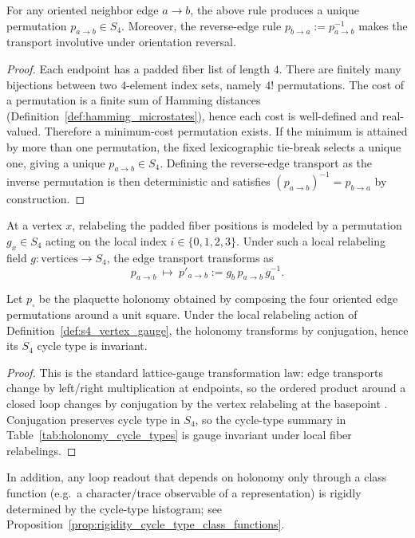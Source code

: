 \begin{lemma}\label{lem:edge_transport_welldefined}
For any oriented neighbor edge $a\to b$, the above rule produces a unique permutation $p_{a\to b}\in S_4$.
Moreover, the reverse-edge rule $p_{b\to a}:=p_{a\to b}^{-1}$ makes the transport involutive under orientation reversal.
\end{lemma}
\begin{proof}
Each endpoint has a padded fiber list of length $4$.
There are finitely many bijections between two $4$-element index sets, namely $4!$ permutations.
The cost of a permutation is a finite sum of Hamming distances (Definition~\ref{def:hamming_microstates}), hence each cost is well-defined and real-valued.
Therefore a minimum-cost permutation exists.
If the minimum is attained by more than one permutation, the fixed lexicographic tie-break selects a unique one, giving a unique $p_{a\to b}\in S_4$.
Defining the reverse-edge transport as the inverse permutation is then deterministic and satisfies $(p_{a\to b})^{-1}=p_{b\to a}$ by construction.
\end{proof}

\begin{definition}\label{def:s4_vertex_gauge}
At a vertex $x$, relabeling the padded fiber positions is modeled by a permutation $g_x\in S_4$ acting on the local index $i\in\{0,1,2,3\}$.
Under such a local relabeling field $g:\text{vertices}\to S_4$, the edge transport transforms as
\[
p_{a\to b}\ \mapsto\ p'_{a\to b}:=g_b\,p_{a\to b}\,g_a^{-1}.
\]
\end{definition}

\begin{proposition}\label{prop:cycle_type_gauge_invariant}
Let $p_\square$ be the plaquette holonomy obtained by composing the four oriented edge permutations around a unit square.
Under the local relabeling action of Definition~\ref{def:s4_vertex_gauge}, the holonomy transforms by conjugation, hence its $S_4$ cycle type is invariant.
\end{proposition}
\begin{proof}
This is the standard lattice-gauge transformation law: edge transports change by left/right multiplication at endpoints, so the ordered product around a closed loop changes by conjugation by the vertex relabeling at the basepoint \cite{Wilson1974,Rothe2012}.
Conjugation preserves cycle type in $S_4$, so the cycle-type summary in Table~\ref{tab:holonomy_cycle_types} is gauge invariant under local fiber relabelings.
\end{proof}
\AuditTag In addition, any loop readout that depends on holonomy only through a class function (e.g.\ a character/trace observable of a representation) is rigidly determined by the cycle-type histogram; see Proposition~\ref{prop:rigidity_cycle_type_class_functions}.

